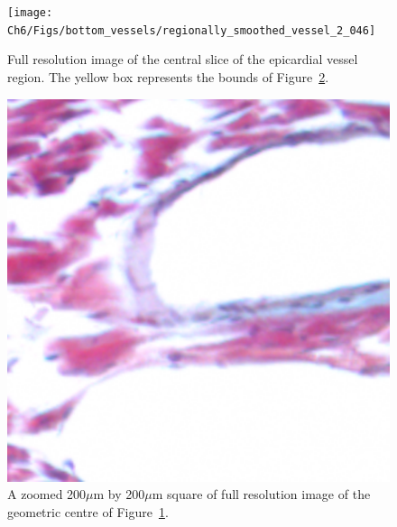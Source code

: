     \begin{figure}
      \centering
      \texttt{[image: Ch6/Figs/bottom\_vessels/regionally\_smoothed\_vessel\_2\_046]}
      \caption{Full resolution image of the central slice of the epicardial vessel region. The yellow box represents the bounds of Figure~\ref{fig:cropped_vessel_cross_section_z}.}
      \label{fig:vessel_cross_section_z}
    \end{figure}
    
    \begin{figure}[p]
      \centering
      \includegraphics[width=\textwidth]{Ch6/Figs/bottom_vessels/cropped_regionally_smoothed_vessel_2_046}
      \caption{A zoomed 200$\mu$m by 200$\mu$m square of full resolution image of the geometric centre of Figure~\ref{fig:vessel_cross_section_z}.}
      \label{fig:cropped_vessel_cross_section_z}
    \end{figure}
    
